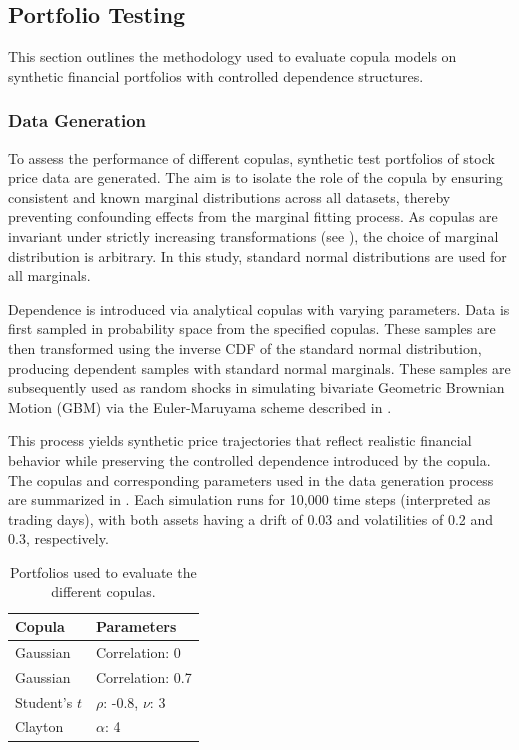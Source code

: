 \subsection{Portfolio Testing}\label{sec:PortfolioTesting}
This section outlines the methodology used to evaluate copula models on synthetic financial portfolios with controlled dependence structures.

\subsubsection{Data Generation}
To assess the performance of different copulas, synthetic test portfolios of stock price data are generated. The aim is to isolate the role of the copula by ensuring consistent and known marginal distributions across all datasets, thereby preventing confounding effects from the marginal fitting process. As copulas are invariant under strictly increasing transformations (see ), the choice of marginal distribution is arbitrary. In this study, standard normal distributions are used for all marginals.

Dependence is introduced via analytical copulas with varying parameters. Data is first sampled in probability space from the specified copulas. These samples are then transformed using the inverse CDF of the standard normal distribution, producing dependent samples with standard normal marginals. These samples are subsequently used as random shocks in simulating bivariate Geometric Brownian Motion (GBM) via the Euler-Maruyama scheme described in .

This process yields synthetic price trajectories that reflect realistic financial behavior while preserving the controlled dependence introduced by the copula. The copulas and corresponding parameters used in the data generation process are summarized in . Each simulation runs for 10,000 time steps (interpreted as trading days), with both assets having a drift of 0.03 and volatilities of 0.2 and 0.3, respectively.

\begin{table}[h!]
    \centering
    \caption{Portfolios used to evaluate the different copulas.}
    \begin{tabular}{ll}
    \textbf{Copula} & \textbf{Parameters} \\
    \hline
    Gaussian & Correlation: 0 \\
    Gaussian & Correlation: 0.7\\
    Student's $t$ & $\rho$: -0.8, $\nu$: 3\\
    Clayton & $\alpha$: 4 \\
    \end{tabular}
    \label{tab:DatasetsUsed}
\end{table}

